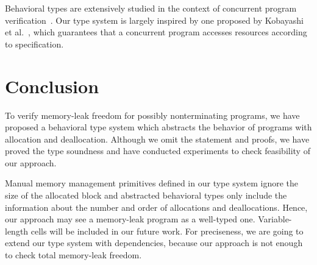 \documentclass{sigplanconf}
\begin{document}
Behavioral types are extensively studied in the context of concurrent
program
verification~\cite{DBLP:conf/esop/HondaVK98,DBLP:journals/tcs/IgarashiK04,DBLP:conf/esop/VieiraCS08,DBLP:journals/lmcs/KobayashiSW06}.
Our type system is largely inspired by one proposed by Kobayashi et
al.~\cite{DBLP:journals/lmcs/KobayashiSW06}, which guarantees that a
concurrent program accesses resources according to specification.

\section{Conclusion}
To verify memory-leak freedom for possibly nonterminating programs, we
have proposed a behavioral type system which abstracts the behavior of
programs with allocation and deallocation. Although we omit the
statement and proofs, we have proved the type soundness and have
conducted experiments to check feasibility of our approach.

Manual memory management primitives defined in our type system ignore
the size of the allocated block and abstracted behavioral types only
include the information about the number and order of allocations and
deallocations.  Hence, our approach may see a memory-leak program as a
well-typed one.  Variable-length cells will be included in our future
work. For preciseness, we are going to extend our type system with
dependencies, because our approach is not enough to check total
memory-leak freedom.


 
\end{document}
